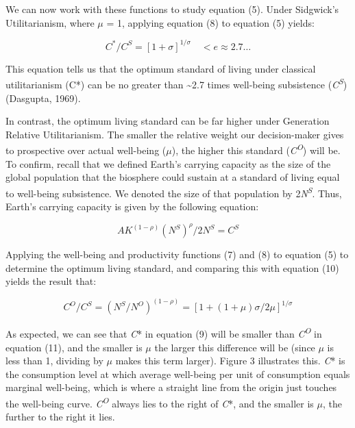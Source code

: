 \documentclass[man,11pt,a4paper,floatsintext]{apa7}
\begin{document}
We can now work with these functions to study equation (5). Under Sidgwick's Utilitarianism, where $\mu$ = 1, applying equation (8) to equation (5) yields:

\begin{equation}
C^*/C^S = [1+\sigma]^{1/\sigma} \quad < e \approx 2.7\ldots
\tag{9}
\end{equation}

\noindent This equation tells us that the optimum standard of living under classical utilitarianism (C*) can be no greater than \textasciitilde{}2.7 times well-being subsistence (\textit{C}\textsuperscript{\textit{S}}) (Dasgupta, 1969).

In contrast, the optimum living standard can be far higher under Generation Relative Utilitarianism. The smaller the relative weight our decision-maker gives to prospective over actual well-being (\textit{$\mu$}), the higher this standard (\textit{C}\textsuperscript{\textit{O}}) will be. To confirm, recall that we defined Earth's carrying capacity as the size of the global population that the biosphere could sustain at a standard of living equal to well-being subsistence. We denoted the size of that population by 2\textit{N}\textsuperscript{\textit{S}}. Thus, Earth's carrying capacity is given by the following equation:

\begin{equation}
AK^{(1-\rho)}(N^S)^{\rho}/2N^S = C^S
\tag{10}
\end{equation}

\noindent Applying the well-being and productivity functions (7) and (8) to equation (5) to determine the optimum living standard, and comparing this with equation (10) yields the result that:

\begin{equation}
C^O/C^S = (N^S/N^O)^{(1-\rho)} = [1+(1+\mu)\sigma/2\mu]^{1/\sigma}
\tag{11}
\end{equation}

\noindent As expected, we can see that \textit{C}* in equation (9) will be smaller than \textit{C}\textsuperscript{\textit{O}} in equation (11), and the smaller is $\mu$ the larger this difference will be (since $\mu$ is less than 1, dividing by $\mu$ makes this term larger). Figure 3 illustrates this. \textit{C}* is the consumption level at which average well-being per unit of consumption equals marginal well-being, which is where a straight line from the origin just touches the well-being curve. \textit{C}\textsuperscript{\textit{O}} always lies to the right of \textit{C}*, and the smaller is $\mu$, the further to the right it lies.
\end{document}

